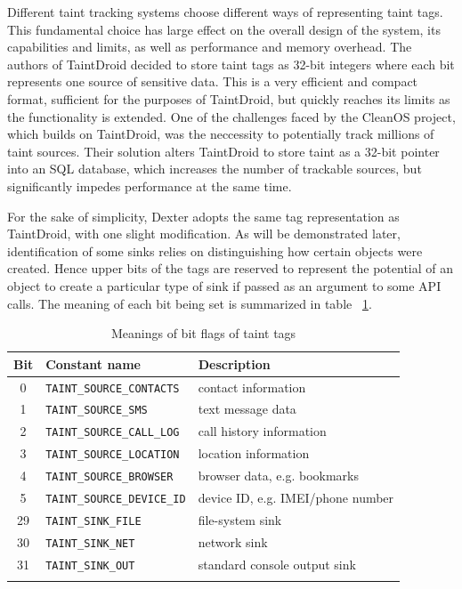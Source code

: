 \documentclass[12pt,twoside,notitlepage]{report}
\begin{document}
Different taint tracking systems choose different ways of representing taint tags. This fundamental choice has large effect on the overall design of the system, its capabilities and limits, as well as performance and memory overhead. The authors of TaintDroid decided to store taint tags as 32-bit integers where each bit represents one source of sensitive data. This is a very efficient and compact format, sufficient for the purposes of TaintDroid, but quickly reaches its limits as the functionality is extended. One of the challenges faced by the CleanOS project, which builds on TaintDroid, was the neccessity to potentially track millions of taint sources. Their solution alters TaintDroid to store taint as a 32-bit pointer into an SQL database, which increases the number of trackable sources, but significantly impedes performance at the same time. 

For the sake of simplicity, Dexter adopts the same tag representation as TaintDroid, with one slight modification. As will be demonstrated later, identification of some sinks relies on distinguishing how certain objects were created. Hence upper bits of the tags are reserved to represent the potential of an object to create a particular type of sink if passed as an argument to some API calls. The meaning of each bit being set is summarized in table ~\ref{table:TaintTagStorage_BitMeaning}.

\begin{table}
	\begin{center}
	\begin{tabular}{|c|l|l|}
		\firsthline
		\textbf{Bit} & \textbf{Constant name}        & \textbf{Description} \\
		\hline
		0            & \verb$TAINT_SOURCE_CONTACTS$  & contact information \\
		1            & \verb$TAINT_SOURCE_SMS$       & text message data \\
		2            & \verb$TAINT_SOURCE_CALL_LOG$  & call history information \\
		3            & \verb$TAINT_SOURCE_LOCATION$  & location information \\
		4            & \verb$TAINT_SOURCE_BROWSER$   & browser data, e.g. bookmarks \\
		5            & \verb$TAINT_SOURCE_DEVICE_ID$ & device ID, e.g. IMEI/phone number \\
		\hline
		29           & \verb$TAINT_SINK_FILE$        & file-system sink \\
		30           & \verb$TAINT_SINK_NET$         & network sink \\
		31           & \verb$TAINT_SINK_OUT$         & standard console output sink \\
		\lasthline
	\end{tabular}
	\end{center}
	\caption{Meanings of bit flags of taint tags}
	\label{table:TaintTagStorage_BitMeaning}
\end{table}
\end{document}
